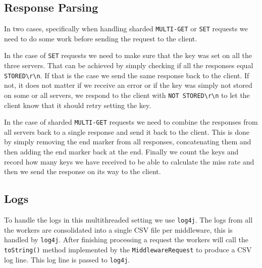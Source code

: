 \documentclass[11pt,a4paper]{article}
\newcommand*{\escape}[1]{\texttt{\textbackslash#1}}
\begin{document}
\subsection{Response Parsing}
%
In two cases, specifically when handling sharded \texttt{MULTI-GET} or \texttt{SET} requests we need to do some work before sending the request to the client.
%
\par
%
In the case of \texttt{SET} requests we need to make sure that the key was set on all the three servers.
%
That can be achieved by simply checking if all the responses equal \texttt{STORED\escape{r}\escape{n}}.
%
If that is the case we send the same response back to the client.
%
If not, it does not matter if we receive an error or if the key was simply not stored on some or all servers, we respond to the client with \texttt{NOT STORED\escape{r}\escape{n}} to let the client know that it should retry setting the key.
%
\par
%
In the case of sharded \texttt{MULTI-GET} requests we need to combine the responses from all servers back to a single response and send it back to the client.
%
This is done by simply removing the end marker from all responses, concatenating them and then adding the end marker back at the end.
%
Finally we count the keys and record how many keys we have received to be able to calculate the miss rate and then we send the response on its way to the client.
%
\subsection{Logs}
%
To handle the logs in this multithreaded setting we use \texttt{log4j}.
%
The logs from all the workers are consolidated into a single CSV file per middleware, this is handled by \texttt{log4j}.
%
After finishing processing a request the workers will call the \texttt{toString()} method implemented by the \texttt{MiddlewareRequest} to produce a CSV log line.
%
This log line is passed to \texttt{log4j}.
%
\end{document}
